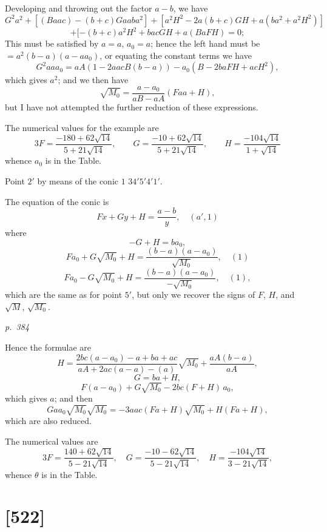 \documentclass[11pt,a4paper]{article}
\theoremstyle{plain}
\theoremstyle{definition}
\begin{document}
Developing and throwing out the factor $a - b$, we have
\[
G^2 a^2
+ [(B a a c) - (b + c) G a a b a^2]
+ [a^2 H^2 - 2 a(b + c) G H + a(b a^2 + a^2 H^2)]
\]
\[
+ [-(b + c)a^2 H^2 + b a c G H + a(B aFH) = 0;
\]
This must be satisfied by $a = a$, $a_0 = a$; hence the left hand must be $= a^2 (b - a)(a - a a_0)$,
or equating the constant terms we have
\[
G^2 a a a_0 = a A (1 - 2 a a c B (b - a)) - a_0 (B - 2 b a F H + a c H^2),
\]
which gives $a^2$; and we then have
\[
\sqrt{M_0} = \frac{a - a_0}{a B - a A}\left(F a a + H\right),
\]
but I have not attempted the further reduction of these expressions.

The numerical values for the example are
\[
3 F = \frac{-180 + 62 \sqrt{14}}{5 + 21 \sqrt{14}}, \qquad G = \frac{-10 + 62 \sqrt{14}}{5 + 21 \sqrt{14}}, \qquad H = \frac{-104 \sqrt{14}}{1 + \sqrt{14}}
\]
whence $a_0$ is in the Table.

Point $2'$ by means of the conic $1$ $34'5'4'1'$.

The equation of the conic is
\[
F x + G y + H = \frac{a - b}{y}, \quad (a', 1)
\]
where
\[
- G + H = b a_0,
\]
\[
F a_0 + G \sqrt{M_0} + H = \frac{(b - a)(a - a_0)}{\sqrt{M_0}}, \quad (1)
\]
\[
F a_0 - G \sqrt{M_0} + H = \frac{(b - a)(a - a_0)}{- \sqrt{M_0}}, \quad (1),
\]
which are the same as for point $5'$, but only we recover the signs of $F$, $H$, and $\sqrt{M}$, $\sqrt{M_0}$.

\clearpage

\bigskip
\textit{p.~384}
\smallskip

\noindent
Hence the formulae are
\[
H = \frac{2 b c (a - a_0) - a + b a + a c}{aA + 2 a c (a - a) - (a)}\sqrt{M_0} + \frac{a A (b - a)}{aA},
\]
\[
G = b a + H,
\]
\[
F(a - a_0) + G \sqrt{M_0} - 2 b c (F + H)\,a_0,
\]
which gives $a$; and then
\[
G a a_0 \sqrt{M_0} \sqrt{M_0} = -3 a a c \left(F a + H\right)\sqrt{M_0} + H\left(F a + H\right),
\]
which are also reduced.

The numerical values are
\[
3 F = \frac{140 + 62 \sqrt{14}}{5 - 21 \sqrt{14}}, \quad G = \frac{-10 - 62 \sqrt{14}}{5 - 21 \sqrt{14}}, \quad H = \frac{-104 \sqrt{14}}{3 - 21 \sqrt{14}},
\]
whence $\theta$ is in the Table.

\clearpage

\section{[522]}
\end{document}

